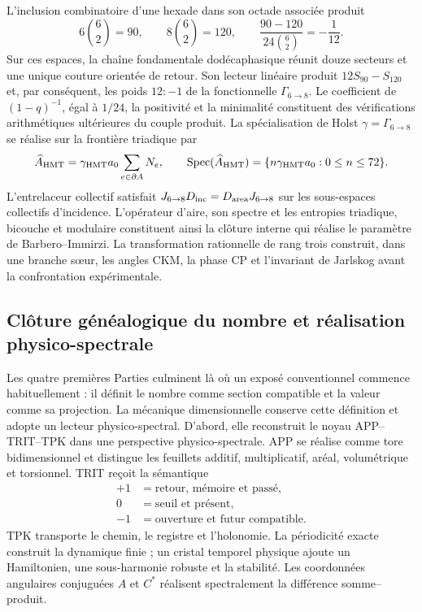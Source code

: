 L'inclusion combinatoire d'une hexade dans son octade associée produit
\[
 6\binom62=90,\qquad
 8\binom62=120,
 \qquad
 \frac{90-120}{24\binom62}=-\frac1{12}.
\]
Sur ces espaces, la chaîne fondamentale dodécaphasique réunit douze secteurs
et une unique couture orientée de retour. Son lecteur linéaire produit
\(12S_{90}-S_{120}\) et, par conséquent, les poids \(12:-1\) de la fonctionnelle
\(\Gamma_{6\to8}\). Le coefficient de \((1-q)^{-1}\), égal à \(1/24\),
la positivité et la minimalité constituent des vérifications arithmétiques
ultérieures du couple produit. La spécialisation de Holst
\(\gamma=\Gamma_{6\to8}\) se réalise sur la frontière triadique par
\[
 \widehat A_{\rm HMT}
 =\gamma_{\rm HMT}a_0\sum_{e\in\partial A}N_e,
 \qquad
 \operatorname{Spec}(\widehat A_{\rm HMT})
 =\{n\gamma_{\rm HMT}a_0:0\le n\le72\}.
\]
L'entrelaceur collectif satisfait
\(J_{6\to8}D_{\rm inc}=D_{\rm area}J_{6\to8}\) sur les sous-espaces
collectifs d'incidence. L'opérateur d'aire, son spectre et les entropies
triadique, bicouche et modulaire constituent ainsi la clôture interne qui réalise le
paramètre de Barbero--Immirzi. La transformation rationnelle de rang trois
construit, dans une branche sœur, les angles CKM, la phase CP et l'invariant
de Jarlskog avant la confrontation expérimentale.

\subsection*{Clôture généalogique du nombre et réalisation physico-spectrale}

Les quatre premières Parties culminent là où un exposé conventionnel commence habituellement :
il définit le nombre comme section compatible et la valeur comme sa projection.
La mécanique dimensionnelle conserve cette définition et adopte un lecteur
physico-spectral. D'abord,
elle reconstruit le noyau APP--TRIT--TPK dans une perspective physico-spectrale. APP se réalise
comme tore bidimensionnel et distingue les feuillets additif, multiplicatif, aréal,
volumétrique et torsionnel. TRIT reçoit la sémantique
\[
 \begin{aligned}
 +1&=\text{retour, mémoire et passé},\\
 0&=\text{seuil et présent},\\
 -1&=\text{ouverture et futur compatible}.
 \end{aligned}
\]
TPK transporte le chemin, le registre et l'holonomie. La périodicité exacte
construit la dynamique finie ; un cristal temporel physique ajoute un Hamiltonien,
une sous-harmonie robuste et la stabilité. Les coordonnées angulaires conjuguées
\(A\) et \(C^*\) réalisent spectralement la différence somme--produit.

